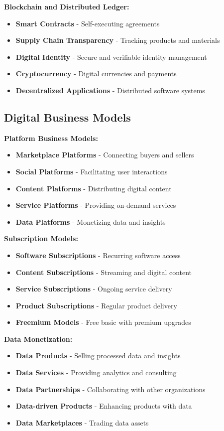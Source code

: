 \documentclass[12pt]{article}
\begin{document}
\textbf{Blockchain and Distributed Ledger:}
\begin{itemize}
    \item \textbf{Smart Contracts} - Self-executing agreements
    \item \textbf{Supply Chain Transparency} - Tracking products and materials
    \item \textbf{Digital Identity} - Secure and verifiable identity management
    \item \textbf{Cryptocurrency} - Digital currencies and payments
    \item \textbf{Decentralized Applications} - Distributed software systems
\end{itemize}

\subsection{Digital Business Models}

\textbf{Platform Business Models:}
\begin{itemize}
    \item \textbf{Marketplace Platforms} - Connecting buyers and sellers
    \item \textbf{Social Platforms} - Facilitating user interactions
    \item \textbf{Content Platforms} - Distributing digital content
    \item \textbf{Service Platforms} - Providing on-demand services
    \item \textbf{Data Platforms} - Monetizing data and insights
\end{itemize}

\textbf{Subscription Models:}
\begin{itemize}
    \item \textbf{Software Subscriptions} - Recurring software access
    \item \textbf{Content Subscriptions} - Streaming and digital content
    \item \textbf{Service Subscriptions} - Ongoing service delivery
    \item \textbf{Product Subscriptions} - Regular product delivery
    \item \textbf{Freemium Models} - Free basic with premium upgrades
\end{itemize}

\textbf{Data Monetization:}
\begin{itemize}
    \item \textbf{Data Products} - Selling processed data and insights
    \item \textbf{Data Services} - Providing analytics and consulting
    \item \textbf{Data Partnerships} - Collaborating with other organizations
    \item \textbf{Data-driven Products} - Enhancing products with data
    \item \textbf{Data Marketplaces} - Trading data assets
\end{itemize}
\end{document}
